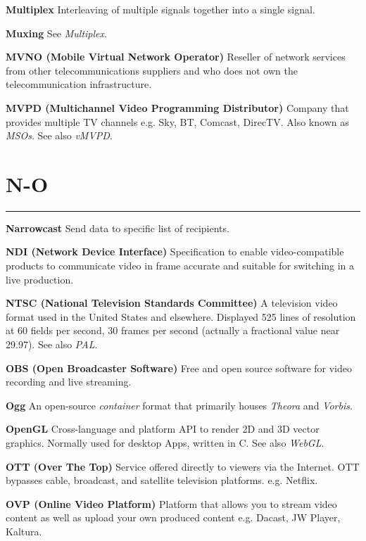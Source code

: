 \smallskip
\textbf{Multiplex}
Interleaving of multiple signals together into a single signal.

\smallskip
\textbf{Muxing}
See \textit{Multiplex}.

\smallskip
\textbf{MVNO (Mobile Virtual Network Operator)}
Reseller of network services from other telecommunications suppliers and who does not own the telecommunication infrastructure.

\smallskip
\textbf{MVPD (Multichannel Video Programming Distributor)}
Company that provides multiple TV channels e.g. Sky, BT, Comcast, DirecTV. Also known as \textit{MSOs}. See also \textit{vMVPD}.


\section{N-O}
\hrule

\medskip
\textbf{Narrowcast}
Send data to specific list of recipients.

\smallskip
\textbf{NDI (Network Device Interface)}
Specification to enable video-compatible products to communicate video in frame accurate and suitable for switching in a live production.

\smallskip
\textbf{NTSC (National Television Standards Committee)}
A television video format used in the United States and elsewhere. Displayed 525 lines of resolution at 60 fields per second, 30 frames per second (actually a fractional value near 29.97). See also \textit{PAL}.

\smallskip
\textbf{OBS (Open Broadcaster Software)}
Free and open source software for video recording and live streaming.

\smallskip
\textbf{Ogg}
An open-source \textit{container} format that primarily houses \textit{Theora} and \textit{Vorbis}.

\smallskip
\textbf{OpenGL}
Cross-language and platform API to render 2D and 3D vector graphics.  Normally used for desktop Apps, written in C. See also \textit{WebGL}.

\smallskip
\textbf{OTT (Over The Top)}
Service offered directly to viewers via the Internet. OTT bypasses cable, broadcast, and satellite television platforms. e.g. Netflix.

\smallskip
\textbf{OVP (Online Video Platform)}
Platform that allows you to stream video content as well as upload your own produced content e.g. Dacast, JW Player, Kaltura.


